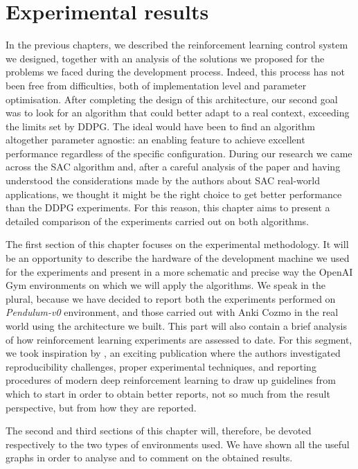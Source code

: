 \chapter{Experimental results} \label{ch:ch5}

In the previous chapters, we described the reinforcement learning control system we designed, together with an analysis of the solutions we proposed for the problems we faced during the development process.
Indeed, this process has not been free from difficulties, both of implementation level and parameter optimisation.
After completing the design of this architecture, our second goal was to look for an algorithm that could better adapt to a real context, exceeding the limits set by DDPG.
The ideal would have been to find an algorithm altogether parameter agnostic: an enabling feature to achieve excellent performance regardless of the specific configuration.
During our research we came across the SAC algorithm and, after a careful analysis of the paper and having understood the considerations made by the authors about SAC real-world applications, we thought it might be the right choice to get better performance than the DDPG experiments.
For this reason, this chapter aims to present a detailed comparison of the experiments carried out on both algorithms.

The first section of this chapter focuses on the experimental methodology.
It will be an opportunity to describe the hardware of the development machine we used for the experiments and present in a more schematic and precise way the OpenAI Gym environments on which we will apply the algorithms.
We speak in the plural, because we have decided to report both the experiments performed on \textit{Pendulum-v0} environment, and those carried out with Anki Cozmo in the real world using the architecture we built.
This part will also contain a brief analysis of how reinforcement learning experiments are assessed to date.
For this segment, we took inspiration by \cite{henderson2018deep}, an exciting publication where the authors investigated reproducibility challenges, proper experimental techniques, and reporting procedures of modern deep reinforcement learning to draw up guidelines from which to start in order to obtain better reports, not so much from the result perspective, but from how they are reported.

The second and third sections of this chapter will, therefore, be devoted respectively to the two types of environments used.
We have shown all the useful graphs in order to analyse and to comment on the obtained results.

